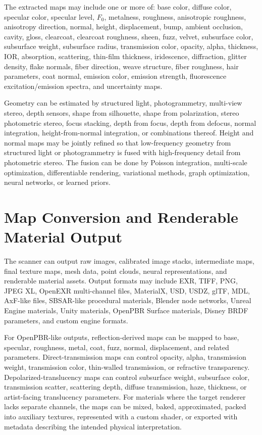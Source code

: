 \documentclass[11pt, twoside, listof=totocnumbered, bibliography=totocnumbered]{scrartcl}
\begin{document}
	The extracted maps may include one or more of: base color, diffuse color, specular color, specular level, $F_0$, metalness, roughness, anisotropic roughness, anisotropy direction, normal, height, displacement, bump, ambient occlusion, cavity, gloss, clearcoat, clearcoat roughness, sheen, fuzz, velvet, subsurface color, subsurface weight, subsurface radius, transmission color, opacity, alpha, thickness, IOR, absorption, scattering, thin-film thickness, iridescence, diffraction, glitter density, flake normals, fiber direction, weave structure, fiber roughness, hair parameters, coat normal, emission color, emission strength, fluorescence excitation/emission spectra, and uncertainty maps.
	
	Geometry can be estimated by structured light, photogrammetry, multi-view stereo, depth sensors, shape from silhouette, shape from polarization, stereo photometric stereo, focus stacking, depth from focus, depth from defocus, normal integration, height-from-normal integration, or combinations thereof. Height and normal maps may be jointly refined so that low-frequency geometry from structured light or photogrammetry is fused with high-frequency detail from photometric stereo. The fusion can be done by Poisson integration, multi-scale optimization, differentiable rendering, variational methods, graph optimization, neural networks, or learned priors.
	
	\section{Map Conversion and Renderable Material Output}
	The scanner can output raw images, calibrated image stacks, intermediate maps, final texture maps, mesh data, point clouds, neural representations, and renderable material assets. Output formats may include EXR, TIFF, PNG, JPEG XL, OpenEXR multi-channel files, MaterialX, USD, USDZ, glTF, MDL, AxF-like files, SBSAR-like procedural materials, Blender node networks, Unreal Engine materials, Unity materials, OpenPBR Surface materials, Disney BRDF parameters, and custom engine formats.
	
	For OpenPBR-like outputs, reflection-derived maps can be mapped to base, specular, roughness, metal, coat, fuzz, normal, displacement, and related parameters. Direct-transmission maps can control opacity, alpha, transmission weight, transmission color, thin-walled transmission, or refractive transparency. Depolarized-translucency maps can control subsurface weight, subsurface color, transmission scatter, scattering depth, diffuse transmission, haze, thickness, or artist-facing translucency parameters. For materials where the target renderer lacks separate channels, the maps can be mixed, baked, approximated, packed into auxiliary textures, represented with a custom shader, or exported with metadata describing the intended physical interpretation.
	
\end{document}
